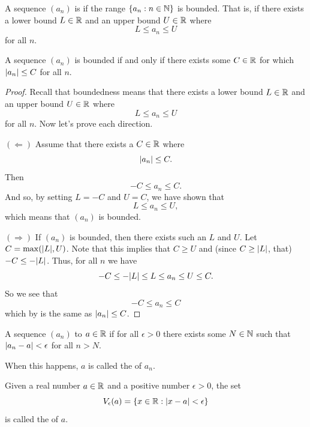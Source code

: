 \documentclass[11pt,twoside=off,numbers=noenddot]{scrbook}
\begin{document}
\begin{definition}
  A sequence $(a_n)$ is  if the range $\{ a_n : n
  \in \mathbb N \}$ is bounded. That is, if there exists a lower bound $L \in
  \mathbb R$ and an upper bound $U \in \mathbb R$ where
  \[ L \leq a_n \leq U \]
  for all $n$.
\end{definition}

\begin{proposition}
  A sequence $(a_n)$ is bounded if and only if there exists some $C
  \in \mathbb R$ for which $| a_n | \leq C$ for all $n$.
\end{proposition}

\begin{proof}
  Recall that boundedness means that there exists a lower bound $L
  \in \mathbb R$ and an upper bound $U \in \mathbb R$ where
  \[ L \leq a_n \leq U \]
  for all $n$. Now let's prove each direction.

  $(\Leftarrow)$ Assume that there exists a $C \in \mathbb R$ where
  \[ | a_n | \leq C. \]
  Then
  \[ -C \leq a_n \leq C. \]
  And so, by setting $L = -C$ and $U = C$, we have shown that
  \[ L \leq a_n \leq U, \]
  which means that $(a_n)$ is bounded.

  $(\Rightarrow)$ If $(a_n)$ is bounded, then there exists such an
  $L$ and $U$. Let $C = \max(| L |, U)$. Note that this implies
  that $C \geq U$ and (since $C \geq | L |$, that) $-C \leq
  -| L |$. Thus, for all $n$ we have
  \[ -C \leq -| L | \leq L \leq a_n \leq U \leq C. \]
  So we see that
  \[ -C \leq a_n \leq C \]
  which by  is the same as
  $| a_n | \leq C$.
\end{proof}

\begin{definition}
  A sequence $(a_n)$  to $a \in \mathbb R$ if for all
  $\epsilon > 0$ there exists some $N \in \mathbb N$ such that $| a_n -
  a | < \epsilon$ for all $n > N$.

  When this happens, $a$ is called the  of $a_n$.
\end{definition}

\begin{definition}
  Given a real number $a \in \mathbb R$ and a positive number $\epsilon > 0$, the set
  \[ V_\epsilon(a) = \{ x \in \mathbb R : | x - a | < \epsilon \} \]
  is called the  of $a$.
\end{definition}
\end{document}
